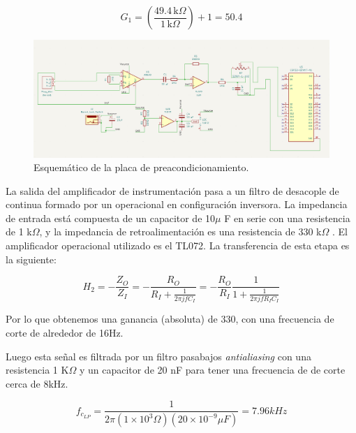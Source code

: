 \begin{equation}
    G_1 = \left(\frac{49.4 \, \text{k}\Omega}{1 \, \text{k}\Omega}\right) + 1 = 50.4
    \label{eq:gain_calculation_1}
\end{equation}

\begin{figure}[H]
    \centering
    \includegraphics[width=1\linewidth]{figuras/Esquematico-Kicad.png}
    \caption{Esquemático de la placa de preacondicionamiento.}
    \label{fig:preconditioning-board-schematic}
\end{figure}

La salida del amplificador de instrumentación pasa a un filtro de desacople de continua formado por un operacional en
configuración inversora. La impedancia de entrada está compuesta de un capacitor de 10$\mu$
F en serie con una resistencia de 1 k$\Omega$, y la impedancia de retroalimentación es una resistencia de 330 k$\Omega$
. El amplificador operacional utilizado es el TL072. La transferencia de esta etapa es la siguiente:

\begin{equation}
    H_2 =  -\frac{Z_O}{Z_I} = -\frac{R_O}{R_I + \frac{1}{2 \pi j f C_I}} = - \frac{R_O}{R_I}
    \frac{1}{1 + \frac{1}{2 \pi j f R_I C_I}}
    \label{eq:gain_calculation_2}
\end{equation}

Por lo que obtenemos una ganancia (absoluta) de 330, con una frecuencia de corte de alrededor de 16Hz.

Luego esta señal es filtrada por un filtro pasabajos \textit{antialiasing} con una resistencia 1 K$\Omega$
y un capacitor de 20 nF para tener una frecuencia de de corte cerca de 8kHz.

\begin{equation}
    f_{c_{LP}} =\frac{1} {2\pi \left(1 \times 10^{3}\Omega \right) \left(20 \times 10^{-9}\mu F \right) } = 7.96kHz
    \label{eq:low_pass_cutoff}
\end{equation}


